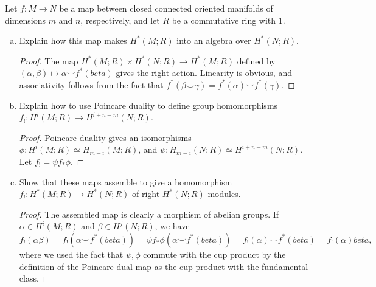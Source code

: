 \documentclass{article}
\begin{document}
 Let $f: M \to N$ be a map between closed connected oriented manifolds of dimensions $m$ and $n$, respectively, and let $R$ be a commutative ring with 1.
\begin{enumerate}[a.]
\item Explain how this map makes $H^*(M; R)$ into an algebra over $H^*(N; R)$.
\begin{proof}
The map $H^*(M; R) \times H^*(N; R) \to  H^*(M; R)$ defined by $(\alpha, \beta) \mapsto \alpha \smile f^*(beta)$ gives the right action. Linearity is obvious, and associativity follows from the fact that $f^*(\beta \smile \gamma) = f^*(\alpha) \smile f^*(\gamma)$.
\end{proof}
\item Explain how to use Poincare duality to define group homomorphisms $f_!: H^i(M;R) \to H^{i+n-m}(N;R)$.
\begin{proof}
Poincare duality gives an isomorphisms $\phi:H^i(M;R) \simeq H_{m-i}(M;R)$, and 
$\psi:H_{m-i}(N;R) \simeq H^{i+n-m}(N;R)$. Let $f_! = \psi f_* \phi$.
\end{proof}
\item Show that these maps assemble to give a homomorphism $f_!:H^*(M;R) \to H^*(N;R)$ of right $H^*(N;R)$-modules.
\begin{proof}
The assembled map is clearly a morphism of abelian groups. If $\alpha \in H^i(M;R)$ and $\beta \in H^j(N;R)$,
we have $f_!(\alpha \beta)= f_!(\alpha \smile f^*(beta)) = \psi f_* \phi (\alpha \smile f^*(beta))
= f_!(\alpha) \smile f^*(beta)
= f_!(\alpha) beta,$ 
where we used the fact that $\psi, \phi$ commute with the cup product by the definition of the Poincare dual map as
the cup product with the fundamental class.
\end{proof}
\end{enumerate}
\end{document}
